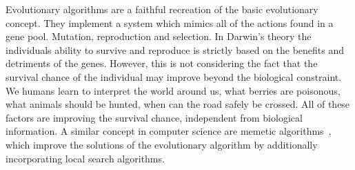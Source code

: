 \documentclass[a4paper,12pt,titlepage, BCOR7mm,headsepline]{scrbook}
\numberwithin{equation}{section}
\begin{document}
Evolutionary algorithms are a faithful recreation of the basic evolutionary concept. They implement a system which mimics all of the actions found in a gene pool. Mutation, reproduction and selection. In Darwin's theory the individuals ability to survive and reproduce is strictly based on the benefits and detriments of the genes. However, this is not considering the fact that the survival chance of the individual may improve beyond the biological constraint. We humans learn to interpret the world around us, what berries are poisonous, what animals should be hunted, when can the road safely be crossed. All of these factors are improving the survival chance, independent from biological information. A similar concept in computer science are memetic algorithms~\cite{moscato1989evolution}, which improve the solutions of the evolutionary algorithm by additionally incorporating local search algorithms. 



%
%
%
%
%
%
\end{document}
